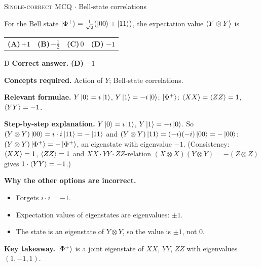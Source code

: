 \documentclass[11pt,a4paper]{article}
\newcommand{\optlabel}[1]{\textbf{(#1)}}
\newcommand{\correctlabel}[1]{\textcolor{okgreen}{\textbf{(#1)}\,\ding{51}}}
\newenvironment{qitem}[1]{\begin{list}{}{\setlength{\leftmargin}{3.3em}\setlength{\labelwidth}{3.1em}%
  \setlength{\labelsep}{0.2em}\setlength{\topsep}{3pt}\setlength{\parsep}{3pt}}\item[\textbf{Q.#1}\hfill]}{\end{list}}
\newcommand{\qsep}{\par\vspace{2pt}{\color{black!15}\hrule}\vspace{4pt}}
\newcommand{\qmeta}[2]{{\footnotesize\color{black!60}\textsc{#1} \;$\cdot$\; #2}\par}
\begin{document}
\begin{qitem}{25}
\qmeta{Single-correct MCQ}{Bell-state correlations}
For the Bell state $\ket{\Phi^+} = \tfrac{1}{\sqrt2}(\ket{00} + \ket{11})$, the expectation value $\braket{Y\otimes Y}$ is
\par\smallskip\noindent\begin{tabularx}{\linewidth}{@{}*{4}{L}@{}}
\optlabel{A}\,$+1$ & \optlabel{B}\,$-\tfrac12$ & \optlabel{C}\,$0$ & \correctlabel{D}\,$-1$
\end{tabularx}
\end{qitem}
\begin{solbox}{D}
\textbf{\color{brand}Correct answer.} \textcolor{okgreen}{\textbf{(D)}} $-1$

\textbf{\color{brand}Concepts required.} Action of $Y$; Bell-state correlations.

\textbf{\color{brand}Relevant formulae.} $Y\ket0 = i\ket1$, $Y\ket1 = -i\ket0$; $\ket{\Phi^+}$: $\braket{XX} = \braket{ZZ} = 1$, $\braket{YY} = -1$.

\textbf{\color{brand}Step-by-step explanation.} $Y\ket0 = i\ket1$, $Y\ket1 = -i\ket0$. So $(Y\otimes Y)\ket{00} = i\cdot i\ket{11} = -\ket{11}$ and $(Y\otimes Y)\ket{11} = (-i)(-i)\ket{00} = -\ket{00}$:
$(Y\otimes Y)\ket{\Phi^+} = -\ket{\Phi^+}$, an eigenstate with eigenvalue $-1$. (Consistency: $\braket{XX} = 1$, $\braket{ZZ} = 1$ and
$XX\cdot YY\cdot ZZ$-relation $(X\otimes X)(Y\otimes Y) = -(Z\otimes Z)$ gives $1\cdot\braket{YY} = -1$.)

\textbf{\color{brand}Why the other options are incorrect.}
\begin{itemize}[leftmargin=2.4em, itemsep=1pt, topsep=2pt]
\item[\textbf{(A)}] Forgets $i\cdot i = -1$.
\item[\textbf{(B)}] Expectation values of eigenstates are eigenvalues: $\pm1$.
\item[\textbf{(C)}] The state is an eigenstate of $Y\otimes Y$, so the value is $\pm1$, not $0$.
\end{itemize}
\textbf{\color{brand}Key takeaway.} $\ket{\Phi^+}$ is a joint eigenstate of $XX$, $YY$, $ZZ$ with eigenvalues $(1, -1, 1)$.
\end{solbox}
\qsep
\end{document}
